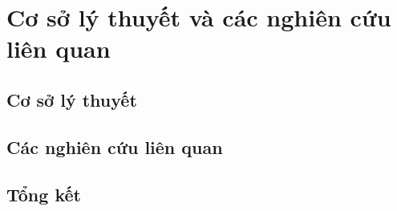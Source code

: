 \chapter{Cơ sở lý thuyết và các nghiên cứu liên quan}
\label{chap:background}

\section{Cơ sở lý thuyết}

\section{Các nghiên cứu liên quan}

\section{Tổng kết}
